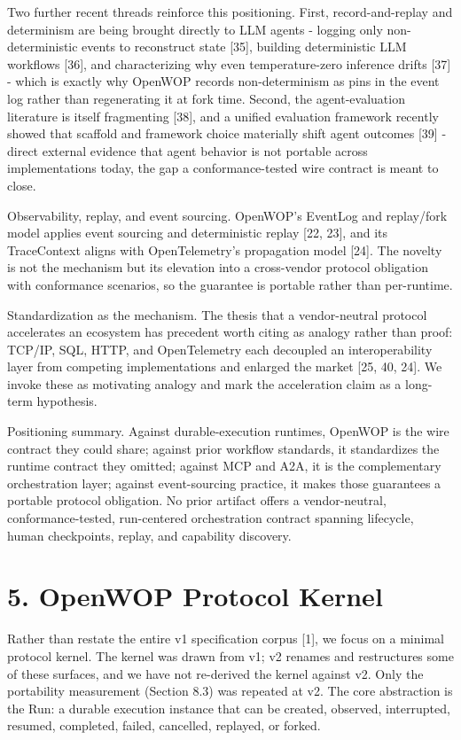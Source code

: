 \documentclass[11pt]{article}
\begin{document}
Two further recent threads reinforce this positioning. First, record-and-replay and determinism are being brought directly to LLM agents - logging only non-deterministic events to reconstruct state [35], building deterministic LLM workflows [36], and characterizing why even temperature-zero inference drifts [37] - which is exactly why OpenWOP records non-determinism as pins in the event log rather than regenerating it at fork time. Second, the agent-evaluation literature is itself fragmenting [38], and a unified evaluation framework recently showed that scaffold and framework choice materially shift agent outcomes [39] - direct external evidence that agent behavior is not portable across implementations today, the gap a conformance-tested wire contract is meant to close.

Observability, replay, and event sourcing. OpenWOP's EventLog and replay/fork model applies event sourcing and deterministic replay [22, 23], and its TraceContext aligns with OpenTelemetry's propagation model [24]. The novelty is not the mechanism but its elevation into a cross-vendor protocol obligation with conformance scenarios, so the guarantee is portable rather than per-runtime.

Standardization as the mechanism. The thesis that a vendor-neutral protocol accelerates an ecosystem has precedent worth citing as analogy rather than proof: TCP/IP, SQL, HTTP, and OpenTelemetry each decoupled an interoperability layer from competing implementations and enlarged the market [25, 40, 24]. We invoke these as motivating analogy and mark the acceleration claim as a long-term hypothesis.

Positioning summary. Against durable-execution runtimes, OpenWOP is the wire contract they could share; against prior workflow standards, it standardizes the runtime contract they omitted; against MCP and A2A, it is the complementary orchestration layer; against event-sourcing practice, it makes those guarantees a portable protocol obligation. No prior artifact offers a vendor-neutral, conformance-tested, run-centered orchestration contract spanning lifecycle, human checkpoints, replay, and capability discovery.

\section*{5. OpenWOP Protocol Kernel}
Rather than restate the entire v1 specification corpus [1], we focus on a minimal protocol kernel. The kernel was drawn from v1; v2 renames and restructures some of these surfaces, and we have not re-derived the kernel against v2. Only the portability measurement (Section 8.3) was repeated at v2. The core abstraction is the Run: a durable execution instance that can be created, observed, interrupted, resumed, completed, failed, cancelled, replayed, or forked.
\end{document}
